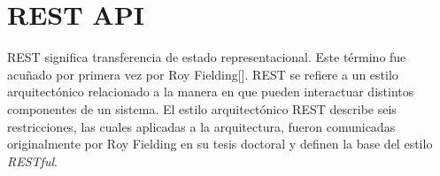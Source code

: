 %
%

\section{REST API}\label{sec:RESTApi}


REST significa transferencia de estado representacional. Este término fue acuñado por primera vez por Roy Fielding[\cite{62}]. REST se refiere a un estilo arquitectónico relacionado a la manera en que pueden interactuar distintos componentes de un sistema. El estilo arquitectónico REST describe seis restricciones, las cuales aplicadas a la arquitectura, fueron comunicadas originalmente por Roy Fielding en su tesis doctoral y definen la base del estilo \textit{RESTful}. 

